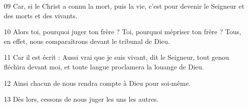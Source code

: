 
09 Car, si le Christ a connu la mort, puis la vie, c’est pour devenir le Seigneur et des morts et des vivants.

10 Alors toi, pourquoi juger ton frère ? Toi, pourquoi mépriser ton frère ? Tous, en effet, nous comparaîtrons devant le tribunal de Dieu.

11 Car il est écrit : Aussi vrai que je suis vivant, dit le Seigneur, tout genou fléchira devant moi, et toute langue proclamera la louange de Dieu.

12 Ainsi chacun de nous rendra compte à Dieu pour soi-même.

13 Dès lors, cessons de nous juger les uns les autres.
